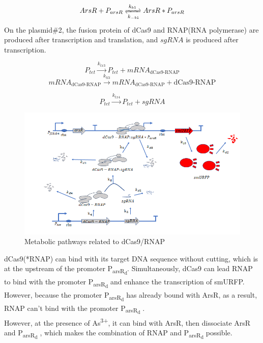 \begin{equation}
	ArsR+P_{arsR} \xrightleftharpoons[k_{-b1}]{k_{b1}}ArsR*P_{arsR} 
\end{equation} 
On the plasmid\#2, the fusion protein of dCas9 and RNAP(RNA polymerase) are produced after transcription and translation, and $sgRNA$ is produced after transcription.


\begin{equation}
	P_{tet} \stackrel{k_{tx3}}{\longrightarrow} P_{tet} +mRNA_\text{dCas9-RNAP}
\end{equation}
\begin{equation}
	mRNA_\text{dCas9-RNAP} \stackrel{k_{tl3}}{\longrightarrow} mRNA_\text{dCas9-RNAP}+\text{dCas9-RNAP}
\end{equation}

\begin{equation}
	P_{tet} \stackrel{k_{tx4}}{\longrightarrow} P_{tet} +sgRNA
\end{equation}

\begin{figure}[h]
	\centering
	\includegraphics[width=12cm]{2}
	\caption{Metabolic pathways related to dCas9/RNAP}
\end{figure}

dCas9(*RNAP) can bind with its target DNA sequence without cutting, which is at the upstream of the promoter P\textsubscript{arsR\textsubscript{d}}. Simultaneously, dCas9 can lead RNAP to bind with the promoter P\textsubscript{arsR\textsubscript{d}} and enhance the transcription of smURFP. However, because the promoter P\textsubscript{arsR\textsubscript{d}} has already bound with ArsR, as a result, RNAP can't bind with the promoter P\textsubscript{arsR\textsubscript{d}} \cite{bikard2013programmable}. \\ 

However, at the presence of As\textsuperscript{3+}, it can bind with ArsR, then dissociate ArsR and P\textsubscript{arsR\textsubscript{d}} , which makes the combination of RNAP and P\textsubscript{arsR\textsubscript{d}} possible. \\

